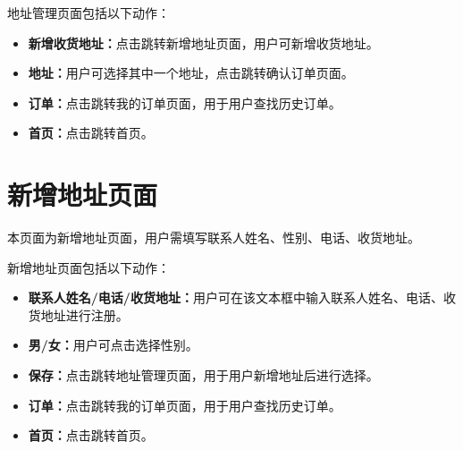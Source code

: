 \documentclass[UTF8]{ctexart}
\begin{document}
地址管理页面包括以下动作：
\begin{itemize}
    \item \textbf{新增收货地址：}点击跳转新增地址页面，用户可新增收货地址。
    \item \textbf{地址：}用户可选择其中一个地址，点击跳转确认订单页面。
    \item \textbf{订单：}点击跳转我的订单页面，用于用户查找历史订单。
    \item \textbf{首页：}点击跳转首页。
\end{itemize}

\section{新增地址页面}
本页面为新增地址页面，用户需填写联系人姓名、性别、电话、收货地址。

新增地址页面包括以下动作：
\begin{itemize}
    \item \textbf{联系人姓名/电话/收货地址：}用户可在该文本框中输入联系人姓名、电话、收货地址进行注册。
    \item \textbf{男/女：}用户可点击选择性别。
    \item \textbf{保存：}点击跳转地址管理页面，用于用户新增地址后进行选择。
    \item \textbf{订单：}点击跳转我的订单页面，用于用户查找历史订单。
    \item \textbf{首页：}点击跳转首页。
\end{itemize}
\end{document}
